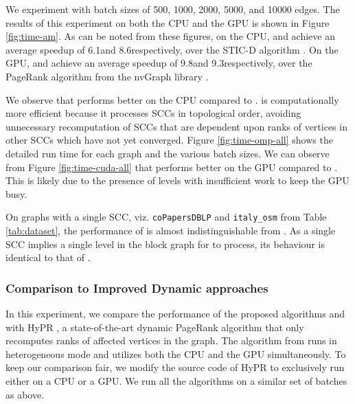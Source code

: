 


We experiment with batch sizes of 500, 1000, 2000, 5000, and 10000 edges. The results of this experiment on both the CPU and the GPU is shown in Figure \ref{fig:time-am}. As can be noted from these figures, on the CPU, \monolithicPR{} and \levelwisePR{} achieve an average speedup of 6.1\x and 8.6\x respectively, over the STIC-D algorithm \cite{pr-sticd16}. On the GPU, \monolithicPR{} and \levelwisePR{} achieve an average speedup of 9.8\x and 9.3\x respectively, over the PageRank algorithm from the nvGraph library \cite{pr-nvgraph}. %

We observe that \levelwisePR{} performs better on the CPU compared to \monolithicPR{}. \levelwisePR{} is computationally more efficient because it processes SCCs in topological order, avoiding unnecessary recomputation of SCCs that are dependent upon ranks of vertices in other SCCs which have not yet converged. Figure \ref{fig:time-omp-all} shows the detailed run time for each graph and the various batch sizes. We can observe from Figure \ref{fig:time-cuda-all} that \monolithicPR{}{} performs better on the GPU compared to \levelwisePR{}. This is likely due to the presence of levels with insufficient work to keep the GPU busy.

On graphs with a single SCC, viz. {\tt coPapersDBLP} and {\tt italy\_osm} from Table \ref{tab:dataset}, the performance of \levelwisePR{} is almost indistinguishable from \monolithicPR{}. As a single SCC implies a single level in the block graph for \levelwisePR{} to process, its behaviour is identical to that of \monolithicPR{}.




\subsubsection{\bf Comparison to Improved Dynamic approaches}

In this experiment, we compare the performance of the proposed algorithms \monolithicPR{} and \levelwisePR{} with HyPR \cite{hipc19}, a state-of-the-art dynamic PageRank algorithm that only recomputes ranks of affected vertices in the graph. The algorithm from \cite{hipc19} runs in heterogeneous mode and utilizes both the CPU and the GPU simultaneously. To keep our comparison fair, we modify the source code of HyPR to exclusively run either on a CPU or a GPU. We run all the algorithms on a similar set of batches as above.

